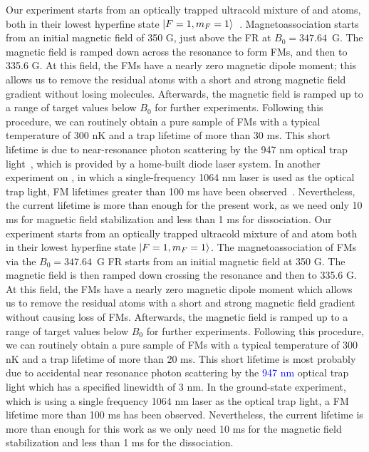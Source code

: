 Our experiment starts from an optically trapped ultracold mixture of \Na and \Rb atoms, both in their lowest hyperfine state $\ket{F = 1, m_F = 1}$~\cite{Wang2013,wang2015,Jia2020}. Magnetoassociation starts from an initial magnetic field of 350 G, just above the FR at $B_0 = 347.64$~G. The magnetic field is ramped down across the resonance to form FMs, and then to 335.6 G. At this field, the FMs have a nearly zero magnetic dipole moment; this allows us to remove the residual atoms with a short and strong magnetic field gradient without losing molecules. Afterwards, the magnetic field is ramped up to a range of target values below $B_0$ for further experiments. Following this procedure, we can routinely obtain a pure sample of \NaRb FMs with a typical temperature of 300 nK and a trap lifetime of more than 30 ms. This short lifetime is due to near-resonance photon scattering by the 947 nm optical trap light~\cite{Guo2017,Jia2020}, which is provided by a home-built diode laser system. In another experiment on \NaRb, in which a single-frequency 1064 nm laser is used as the optical trap light, FM lifetimes greater than 100 ms have been observed~\cite{Wang2019,guo2021}. Nevertheless, the current lifetime is more than enough for the present work, as we need only 10 ms for magnetic field stabilization and less than 1 ms for dissociation.
Our experiment starts from an optically trapped ultracold mixture of \Na and \Rb atom both in their lowest hyperfine state $\ket{F = 1, m_F = 1}$. The magnetoassociation of FMs via the $B_0 = 347.64$~G FR starts from an initial magnetic field at 350 G. The magnetic field is then ramped down crossing the resonance and then to 335.6 G. At this field, the FMs have a nearly zero magnetic dipole moment which allows us to remove the residual atoms with a short and strong magnetic field gradient without causing loss of FMs. Afterwards, the magnetic field is ramped up to a range of target values below $B_0$ for further experiments. Following this procedure, we can routinely obtain a pure sample of \NaRb FMs with a typical temperature of 300 nK and a trap lifetime of more than 20 ms. This short lifetime is most probably due to accidental near resonance photon scattering by the \textcolor{blue}{947 nm} optical trap light which has a specified linewidth of 3 nm. In the ground-state \NaRb experiment, which is using a single frequency 1064 nm laser as the optical trap light, a FM lifetime more than 100 ms has been observed. Nevertheless, the current lifetime is more than enough for this work as we only need 10 ms for the magnetic field stabilization and less than 1 ms for the dissociation.  

